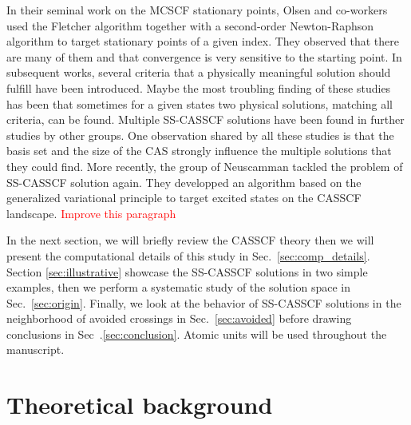 \documentclass[aps,prb,reprint,showkeys,superscriptaddress]{revtex4-1}
\newcommand{\todo}[1]{\textcolor{red}{#1}}
\begin{document}
In their seminal work on the MCSCF stationary points, Olsen and co-workers used the Fletcher algorithm together with a second-order Newton-Raphson algorithm to target stationary points of a given index. \cite{Olsen_1982,Olsen_1983}
They observed that there are many of them and that convergence is very sensitive to the starting point.
In subsequent works, several criteria that a physically meaningful solution should fulfill have been introduced. \cite{Olsen_1983,Golab_1983,Golab_1985,Rizzo_1990}
Maybe the most troubling finding of these studies has been that sometimes for a given states two physical solutions, \ie matching all criteria, can be found. \cite{Rizzo_1990}
Multiple SS-CASSCF solutions have been found in further studies by other groups. \cite{Guihery_1997,Angeli_2003}
One observation shared by all these studies is that the basis set and the size of the CAS strongly influence the multiple solutions that they could find.
More recently, the group of Neuscamman tackled the problem of SS-CASSCF solution again. They developped an algorithm based on the generalized variational principle to target excited states on the CASSCF landscape. \cite{Tran_2019,Tran_2020,Hanscam_2021}
\todo{Improve this paragraph}

In the next section, we will briefly review the CASSCF theory then we will present the computational details of this study in Sec.~\ref{sec:comp_details}.
Section \ref{sec:illustrative} showcase the SS-CASSCF solutions in two simple examples, then we perform a systematic study of the solution space in Sec.~\ref{sec:origin}.
Finally, we look at the behavior of SS-CASSCF solutions in the neighborhood of avoided crossings in Sec.~\ref{sec:avoided} before drawing conclusions in Sec~.\ref{sec:conclusion}.
Atomic units will be used throughout the manuscript.

\section{Theoretical background}
\label{sec:theoretical}
\end{document}
